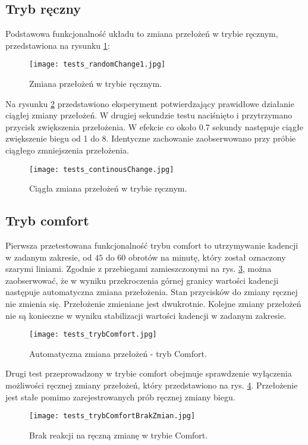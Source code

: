 \subsection{Tryb ręczny}
Podstawowa funkcjonalność układu to zmiana przełożeń w trybie ręcznym, przedstawiona na rysunku \ref{fig:tests_randomChange}:
 
\begin{figure}[h]
    \centering
    \texttt{[image: tests\_randomChange1.jpg]}
    \caption{Zmiana przełożeń w trybie ręcznym.}
    \label{fig:tests_randomChange}
\end{figure}

Na rysunku \ref{fig:tests_continousChange} przedstawiono eksperyment potwierdzający prawidłowe działanie ciągłej zmiany przełożeń. W drugiej sekundzie testu naciśnięto i przytrzymano przycisk zwiększenia przełożenia. W efekcie co około 0.7 sekundy następuje ciągłe zwiększenie biegu od 1 do 8. Identyczne zachowanie zaobserwowano przy próbie ciągłego zmniejszenia przełożenia.

\begin{figure}[h]
    \centering
    \texttt{[image: tests\_continousChange.jpg]}
    \caption{Ciągła zmiana przełożeń w trybie ręcznym.}
    \label{fig:tests_continousChange}
\end{figure}
\subsection{Tryb comfort}

Pierwsza przetestowana funkcjonalność trybu comfort to utrzymywanie kadencji w zadanym zakresie, od $45$ do $60$ obrotów na minutę, który został oznaczony szarymi liniami. Zgodnie z przebiegami zamieszczonymi na rys. \ref{fig:tests_trybComfort}, można zaobserwować, że w wyniku przekroczenia górnej granicy wartości kadencji następuje automatyczna zmiana przełożenia. Stan przycisków do zmiany ręcznej nie zmienia się. Przełożenie zmieniane jest dwukrotnie. Kolejne zmiany przełożeń nie są konieczne w wyniku stabilizacji wartości kadencji w zadanym zakresie. 
\begin{figure}[h]
    \centering
    \texttt{[image: tests\_trybComfort.jpg]}
    \caption{Automatyczna zmiana przełożeń - tryb Comfort.}
    \label{fig:tests_trybComfort}
\end{figure}

Drugi test przeprowadzony w trybie comfort obejmuje sprawdzenie wyłączenia możliwości ręcznej zmiany przełożeń, który przedstawiono na rys. \ref{fig:tests_noChange}. Przełożenie jest stałe pomimo zarejestrowanych prób ręcznej zmiany biegu.
\begin{figure}[h]
    \centering
    \texttt{[image: tests\_trybComfortBrakZmian.jpg]}
    \caption{Brak reakcji na ręczną zmianę w trybie Comfort.}
    \label{fig:tests_noChange}
\end{figure}

